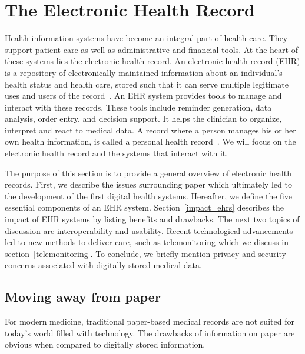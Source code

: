 \section{The Electronic Health Record}\label{background}

Health information systems have become an integral part of health care. They support patient care as well as administrative and financial tools. At the heart of these systems lies the electronic health record. An electronic health record (EHR) is a repository of electronically maintained information about an individual's health status and health care, stored such that it can serve multiple legitimate uses and users of the record~\cite{Shortliffe2014}. An EHR system provides tools to manage and interact with these records. These tools include reminder generation, data analysis, order entry, and decision support. It helps the clinician to organize, interpret and react to medical data. A record where a person manages his or her own health information, is called a personal health record~\cite{Tang2006}. We will focus on the electronic health record and the systems that interact with it.

The purpose of this section is to provide a general overview of electronic health records. First, we describe the issues surrounding paper which ultimately led to the development of the first digital health systems. Hereafter, we define the five essential components of an EHR system. Section~\ref{impact_ehrs} describes the impact of EHR systems by listing benefits and drawbacks. The next two topics of discussion are interoperability and usability. Recent technological advancements led to new methods to deliver care, such as telemonitoring which we discuss in section~\ref{telemonitoring}. To conclude, we briefly mention privacy and security concerns associated with digitally stored medical data.

    \subsection{Moving away from paper}\label{paper}

    For modern medicine, traditional paper-based medical records are not suited for today's world filled with technology. The drawbacks of information on paper are obvious when compared to digitally stored information.

